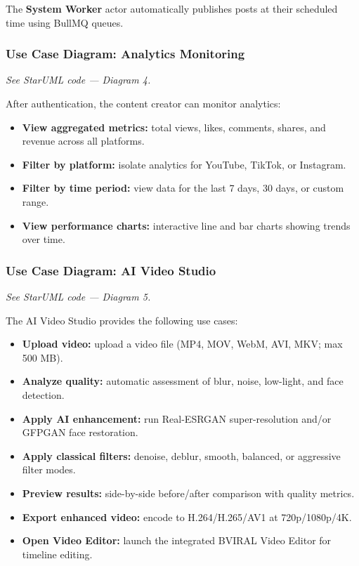 The \textbf{System Worker} actor automatically publishes posts at their scheduled time using BullMQ queues.

\subsubsection*{Use Case Diagram: Analytics Monitoring}

\noindent\textit{See StarUML code --- Diagram 4.}

After authentication, the content creator can monitor analytics:
\begin{itemize}
    \item \textbf{View aggregated metrics:} total views, likes, comments, shares, and revenue across all platforms.
    \item \textbf{Filter by platform:} isolate analytics for YouTube, TikTok, or Instagram.
    \item \textbf{Filter by time period:} view data for the last 7 days, 30 days, or custom range.
    \item \textbf{View performance charts:} interactive line and bar charts showing trends over time.
\end{itemize}

\subsubsection*{Use Case Diagram: AI Video Studio}

\noindent\textit{See StarUML code --- Diagram 5.}

The AI Video Studio provides the following use cases:
\begin{itemize}
    \item \textbf{Upload video:} upload a video file (MP4, MOV, WebM, AVI, MKV; max 500 MB).
    \item \textbf{Analyze quality:} automatic assessment of blur, noise, low-light, and face detection.
    \item \textbf{Apply AI enhancement:} run Real-ESRGAN super-resolution and/or GFPGAN face restoration.
    \item \textbf{Apply classical filters:} denoise, deblur, smooth, balanced, or aggressive filter modes.
    \item \textbf{Preview results:} side-by-side before/after comparison with quality metrics.
    \item \textbf{Export enhanced video:} encode to H.264/H.265/AV1 at 720p/1080p/4K.
    \item \textbf{Open Video Editor:} launch the integrated BVIRAL Video Editor for timeline editing.
\end{itemize}

